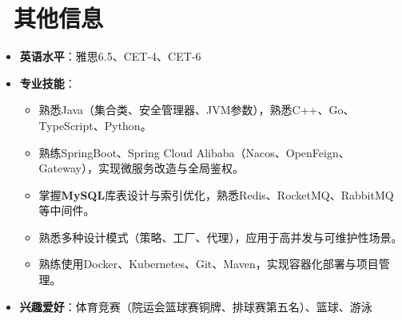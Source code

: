 \documentclass{../../styles/resume}
\begin{document}
\section{\faInfo\ 其他信息}
\begin{itemize}
  \item \textbf{英语水平}：雅思6.5、CET-4、CET-6
  \item \textbf{专业技能}：
    \begin{itemize}
      \item 熟悉Java（集合类、安全管理器、JVM参数），熟悉C++、Go、TypeScript、Python。 %
      \item 熟练SpringBoot、Spring Cloud Alibaba（Nacos、OpenFeign、Gateway），实现微服务改造与全局鉴权。 %
      \item 掌握\textbf{MySQL}库表设计与索引优化，熟悉Redis、RocketMQ、RabbitMQ等中间件。 %
      \item 熟悉多种设计模式（策略、工厂、代理），应用于高并发与可维护性场景。 %
      \item 熟练使用Docker、Kubernetes、Git、Maven，实现容器化部署与项目管理。 %
    \end{itemize}
    \item \textbf{兴趣爱好}：体育竞赛（院运会篮球赛铜牌、排球赛第五名）、篮球、游泳
\end{itemize}
\end{document}
